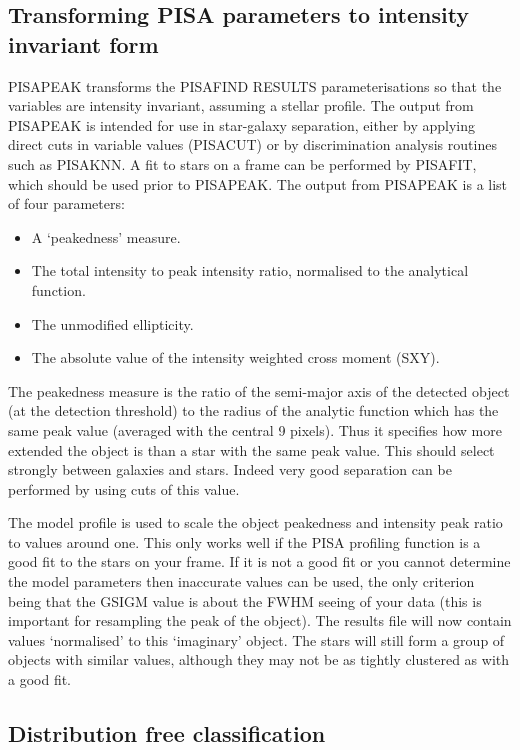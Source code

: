 \subsection{Transforming PISA parameters to intensity invariant form}

PISAPEAK transforms the PISAFIND RESULTS parameterisations so that the
variables are intensity invariant, assuming a stellar profile. The
output from PISAPEAK is intended for use in star-galaxy separation,
either by applying direct cuts in variable values (PISACUT) or by
discrimination analysis routines such as PISAKNN. A fit to stars on a
frame can be performed by PISAFIT, which should be used prior to
PISAPEAK. The output from PISAPEAK is a list of four parameters:
\begin{itemize}
\item A `peakedness' measure.
\item The total intensity to peak intensity ratio, normalised to the
analytical function.
\item The unmodified ellipticity.
\item The absolute value of the intensity weighted cross moment (SXY).
\end{itemize}

The peakedness measure is the ratio of the semi-major axis of the
detected object (at the detection threshold) to the radius of the
analytic function which has the same peak value (averaged with the
central 9 pixels). Thus it specifies how more extended the object is
than a star with the same peak value. This should select strongly
between galaxies and stars. Indeed very good separation can be performed
by using cuts of this value.

The model profile is used to scale the object peakedness and intensity
peak ratio to values around one. This only works well if the PISA
profiling function is a good fit to the stars on your frame. If it is
not a good fit or you cannot determine the model parameters then
inaccurate values can be used, the only criterion being that the GSIGM
value is about the FWHM seeing of your data (this is important for
resampling the peak of the object). The results file will now contain
values `normalised' to this `imaginary' object. The stars will still
form a group of objects with similar values, although they may not be as
tightly clustered as with a good fit.

\subsection {Distribution free classification}

